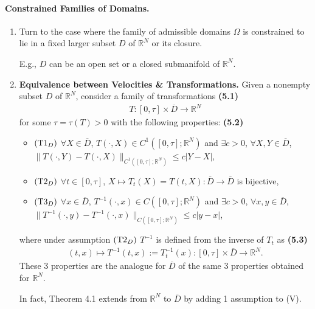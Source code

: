 \documentclass{book}
\numberwithin{equation}{section}
\begin{document}
\paragraph{Constrained Families of Domains.}
\begin{enumerate}
    \item Turn to the case where the family of admissible domains $\Omega$ is constrained to lie in a fixed larger subset $D$ of $\mathbb{R}^N$ or its closure.
    
    E.g., $D$ can be an open set or a closed submanifold of $\mathbb{R}^N$.
    \item \textbf{Equivalence between Velocities \& Transformations.} Given a nonempty subset $D$ of $\mathbb{R}^N$, consider a family of transformations \textbf{(5.1)}
    \begin{align*}
        T:[0,\tau]\times\overline{D}\to\mathbb{R}^N
    \end{align*}
    for some $\tau = \tau(T) > 0$ with the following properties: \textbf{(5.2)}
    \begin{itemize}
        \item $({\rm T1}_D)$ $\forall X\in\overline{D}$, $T(\cdot,X)\in C^1([0,\tau];\mathbb{R}^N)$ and $\exists c > 0$, $\forall X,Y\in\overline{D}$, $\|T(\cdot,Y) - T(\cdot,X)\|_{C^1\left([0,\tau];\mathbb{R}^N\right)}\le c|Y - X|$,
        \item $({\rm T2}_D)$ $\forall t\in[0,\tau]$, $X\mapsto T_t(X) = T(t,X):\overline{D}\to\overline{D}$ is bijective,
        \item $({\rm T3}_D)$ $\forall x\in\overline{D}$, $T^{-1}(\cdot,x)\in C([0,\tau];\mathbb{R}^N)$ and $\exists c > 0$, $\forall x,y\in\overline{D}$, $\|T^{-1}(\cdot,y) - T^{-1}(\cdot,x)\|_{C\left([0,\tau];\mathbb{R}^N\right)}\le c|y - x|$,
    \end{itemize}
    where under assumption $({\rm T2}_D)$ $T^{-1}$ is defined from the inverse of $T_t$ as \textbf{(5.3)}
    \begin{align*}
        (t,x)\mapsto T^{-1}(t,x) := T_t^{-1}(x):[0,\tau]\times\overline{D}\to\mathbb{R}^N.
    \end{align*}
    These 3 properties are the analogue for $\overline{D}$ of the same 3 properties obtained for $\mathbb{R}^N$.
    
    In fact, Theorem 4.1 extends from $\mathbb{R}^N$ to $\overline{D}$ by adding 1 assumption to (V).
    

\end{enumerate}
\end{document}
